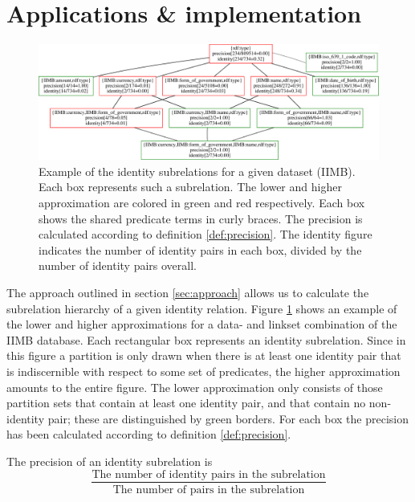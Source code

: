 \section{Applications \& implementation}
\label{sec:implementation}

\begin{figure}
\label{fig:ihierarchy}
\centering
\includegraphics[width=\textwidth]{./img/iimb_16_2}
\caption{
  Example of the identity subrelations for a given dataset (IIMB).
  Each box represents such a subrelation.
  The lower and higher approximation are colored in green and red
    respectively.
  Each box shows the shared predicate terms in curly braces.
  The precision is calculated according to definition \ref{def:precision}.
  The identity figure indicates the number of identity pairs in each box,
    divided by the number of identity pairs overall.
}
\end{figure}

The approach outlined in section \ref{sec:approach}
  allows us to calculate the subrelation hierarchy of
  a given identity relation.
Figure \ref{fig:ihierarchy} shows an example of the lower and higher
  approximations for a data- and linkset combination of the IIMB database.
Each rectangular box represents an identity subrelation.
Since in this figure a partition is only drawn when there is at least one
  identity pair that is indiscernible with respect to some set of
  predicates, the higher approximation amounts to the entire figure.
The lower approximation only consists of those partition sets that contain
  at least one identity pair, and that contain no non-identity pair;
  these are distinguished by green borders.
For each box the precision has been calculated
  according to definition \ref{def:precision}.

\begin{definition}[Precision]
\label{def:precision}
The precision of an identity subrelation is
\[
  \frac{
    \text{The number of identity pairs in the subrelation}
  }{
    \text{The number of pairs in the subrelation}
  }
\]
\end{definition}

